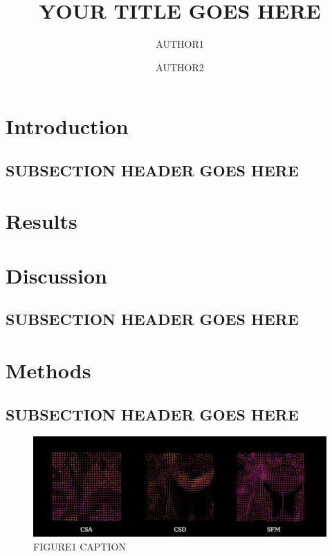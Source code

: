 \documentclass[fleqn,10pt]{wlscirep}
\title{YOUR TITLE GOES HERE}
\author[1,*]{AUTHOR1}
\author[1,*]{AUTHOR2}
\affil[*]{EMAIL}
\begin{document}
\maketitle

\section*{Introduction}
\subsection{SUBSECTION HEADER GOES HERE}

\section*{Results}


\section*{Discussion}
\subsection{SUBSECTION HEADER GOES HERE}

\section*{Methods}
\subsection{SUBSECTION HEADER GOES HERE}

\begin{figure}
\centering
\includegraphics[width=\linewidth, angle=0, scale=1.0, keepaspectratio=true]{figures/SAMPLE_FIGURE_1.png}
\caption{FIGURE1 CAPTION}
\label{fig:FIGURE1_LABEL}
\end{figure}
\end{document}
